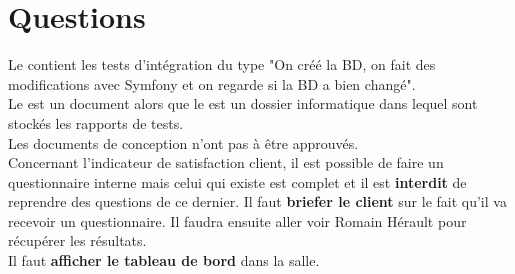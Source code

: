 \documentclass [a4paper] {article}
\begin{document}
\section{Questions}

Le \PTI{} contient les tests d'intégration du type "On créé la BD, on fait des modifications avec Symfony et on regarde si la BD a bien changé".\\

Le \PTU{} est un document alors que le \DTU{} est un dossier informatique dans lequel sont stockés les rapports de tests. \\

Les documents de conception n'ont pas à être approuvés.\\

Concernant l'indicateur de satisfaction client, il est possible de faire un questionnaire interne mais celui qui existe est complet et il est \textbf{interdit} de reprendre des questions de ce dernier. Il faut \textbf{briefer le client} sur le fait qu'il va recevoir un questionnaire. Il faudra ensuite aller voir Romain Hérault pour récupérer les résultats.\\

Il faut \textbf{afficher le tableau de bord} dans la salle.
\end{document}
